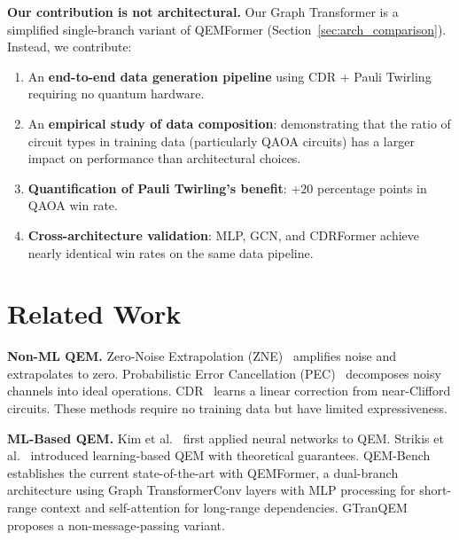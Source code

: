 \documentclass[11pt, a4paper]{article}
\begin{document}
\textbf{Our contribution is not architectural.} Our Graph Transformer is a
simplified single-branch variant of QEMFormer (Section~\ref{sec:arch_comparison}).
Instead, we contribute:

\begin{enumerate}
    \item An \textbf{end-to-end data generation pipeline} using CDR + Pauli
    Twirling requiring no quantum hardware.
    
    \item An \textbf{empirical study of data composition}: demonstrating that
    the ratio of circuit types in training data (particularly QAOA circuits)
    has a larger impact on performance than architectural choices.
    
    \item \textbf{Quantification of Pauli Twirling's benefit}: +20
    percentage points in QAOA win rate.
    
    \item \textbf{Cross-architecture validation}: MLP, GCN, and CDRFormer
    achieve nearly identical win rates on the same data pipeline.
\end{enumerate}

\section{Related Work}
\label{sec:related}

\textbf{Non-ML QEM.}
Zero-Noise Extrapolation (ZNE)~\cite{temme2017zne, li2017pec} amplifies noise
and extrapolates to zero. Probabilistic Error Cancellation
(PEC)~\cite{li2017pec} decomposes noisy channels into ideal operations.
CDR~\cite{czarnik2021cdr} learns a linear correction from near-Clifford
circuits. These methods require no training data but have limited
expressiveness.

\textbf{ML-Based QEM.}
Kim et al.~\cite{kim2020neuralqem} first applied neural networks to QEM.
Strikis et al.~\cite{strikis2021learning} introduced learning-based QEM with
theoretical guarantees. QEM-Bench~\cite{bao2025qemformer} establishes the
current state-of-the-art with QEMFormer, a dual-branch architecture using
Graph TransformerConv layers with MLP processing for short-range context and
self-attention for long-range dependencies. GTranQEM~\cite{bao2025gtranqem}
proposes a non-message-passing variant.
\end{document}
